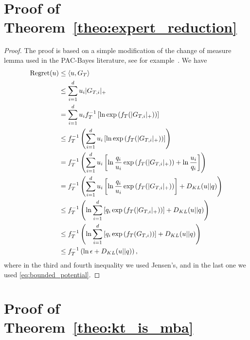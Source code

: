 \section{Proof of Theorem~\ref{theo:expert_reduction}}
\begin{proof}
The proof is based on a simple modification of the change of measure lemma used in the PAC-Bayes literature, see for example~\citet{McAllester13}.
We have
\begin{align*}
\operatorname{Regret}(u) 
& \leq \langle u, G_T \rangle \\
& \leq \sum_{i=1}^d u_i |G_{T,i}|_+ \\
& = \sum_{i=1}^d u_i f_T^{-1}\left[\ln \exp\left(f_T(|G_{T,i}|_+)\right)\right] \\
& \leq f_T^{-1}\left(\sum_{i=1}^d u_i \left[\ln \exp\left(f_T(|G_{T,i}|_+)\right)\right]\right) \\
& = f_T^{-1}\left(\sum_{i=1}^d u_i \left[\ln \frac{q_i}{u_i}\exp\left(f_T(|G_{T,i}|_+)\right)+ \ln\frac{u_i}{q_i}\right]\right) \\
& = f_T^{-1}\left(\sum_{i=1}^d u_i \left[\ln \frac{q_i}{u_i}\exp\left(f_T(|G_{T,i}|_+)\right)\right] + D_{KL}(u||q)\right) \\
& \leq f_T^{-1}\left(\ln \sum_{i=1}^d \left[q_i \exp\left(f_T(|G_{T,i}|_+)\right)\right] + D_{KL}(u||q)\right) \\
& \leq f_T^{-1}\left(\ln \sum_{i=1}^d \left[q_i \exp\left(f_T(G_{T,i})\right)\right] + D_{KL}(u||q)\right) \\
& \leq f_T^{-1}\left(\ln \epsilon + D_{KL}(u||q)\right),
\end{align*}
where in the third and fourth inequality we used Jensen's, and in the last one
we used \eqref{eq:bounded_potential}.
\end{proof}

\section{Proof of Theorem~\ref{theo:kt_is_mba}}

